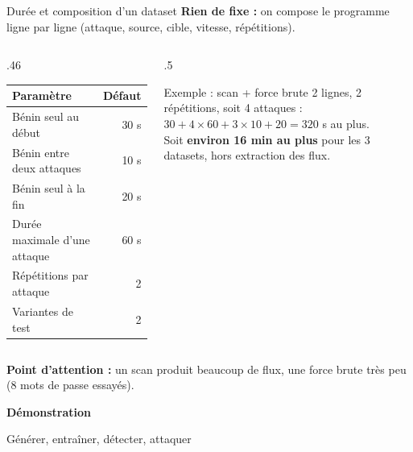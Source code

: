 \documentclass[aspectratio=169,11pt,xcolor=table]{beamer}
\begin{document}
\begin{frame}{Durée et composition d'un dataset}
  \textbf{Rien de fixe :} on compose le programme ligne par ligne (attaque, source, cible, vitesse, répétitions).
  \vspace{.7em}

  \begin{columns}[T]
    \begin{column}{.46\linewidth}
      \small
      \renewcommand{\arraystretch}{1.2}
      \begin{tabular}{@{}lr@{}}
        \toprule
        \textbf{Paramètre} & \textbf{Défaut} \\
        \midrule
        Bénin seul au début & 30 s \\
        Bénin entre deux attaques & 10 s \\
        Bénin seul à la fin & 20 s \\
        Durée maximale d'une attaque & 60 s \\
        Répétitions par attaque & 2 \\
        Variantes de test & 2 \\
        \bottomrule
      \end{tabular}
    \end{column}
    \begin{column}{.5\linewidth}
      \begin{block}{Exemple : scan + force brute}
        2 lignes, 2 répétitions, soit 4 attaques :\\
        $30 + 4\times 60 + 3\times 10 + 20 = 320$ s au plus.\\[.3em]
        Soit \textbf{environ 16 min au plus} pour les 3 datasets, hors extraction des flux.
      \end{block}
    \end{column}
  \end{columns}
  \vfill
  \textbf{Point d'attention :} un scan produit beaucoup de flux, une force brute très peu (8 mots de passe essayés).
\end{frame}

\begin{frame}[plain]
  \centering
  \vfill
  {\fontsize{36}{44}\selectfont\bfseries\color{projectblue} Démonstration\par}
  \vspace{1em}
  {\large Générer, entraîner, détecter, attaquer\par}
  \vfill
\end{frame}
\end{document}
